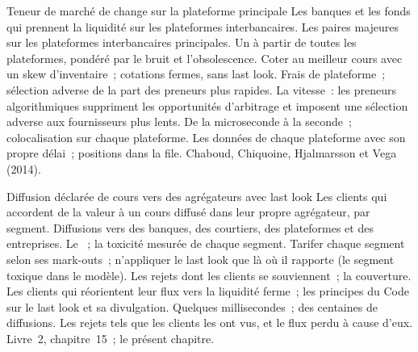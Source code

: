 \begin{strategyfile}{Teneur de marché de change sur la plateforme principale}\label{strat:hf:fx-market-making:primary}
 Les banques et les fonds qui prennent la liquidité sur les plateformes interbancaires.
 Les paires majeures sur les plateformes interbancaires principales.
 Un  à partir de toutes les plateformes, pondéré par le bruit et l'obsolescence.
 Coter au meilleur cours avec un skew d'inventaire~; cotations fermes, sans last look.
 Frais de plateforme~; sélection adverse de la part des preneurs plus rapides.
 La vitesse~: les preneurs algorithmiques suppriment les opportunités d'arbitrage et imposent une sélection adverse aux fournisseurs plus lents.
 De la microseconde à la seconde~; colocalisation sur chaque plateforme.
 Les données de chaque plateforme avec son propre délai~; positions dans la file.
 Chaboud, Chiquoine, Hjalmarsson et Vega (2014).
\end{strategyfile}

\begin{strategyfile}{Diffusion déclarée de cours vers des agrégateurs avec last look}\label{strat:hf:fx-market-making:stream}
 Les clients qui accordent de la valeur à un cours diffusé dans leur propre agrégateur, par segment.
 Diffusions vers des banques, des courtiers, des plateformes et des entreprises.
 Le ~; la toxicité mesurée de chaque segment.
 Tarifer chaque segment selon ses mark-outs~; n'appliquer le last look que là où il rapporte (le segment toxique dans le modèle).
 Les rejets dont les clients se souviennent~; la couverture.
 Les clients qui réorientent leur flux vers la liquidité ferme~; les principes du Code sur le last look et sa divulgation.
 Quelques millisecondes~; des centaines de diffusions.
 Les rejets tels que les clients les ont vus, et le flux perdu à cause d'eux.
 Livre~2, chapitre~15~; le présent chapitre.
\end{strategyfile}

